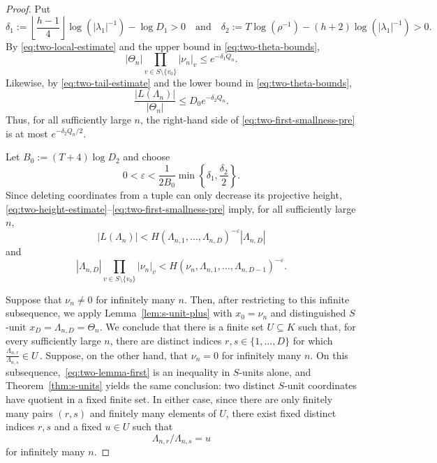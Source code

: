 \documentclass[a4paper,UKenglish,cleveref, autoref, thm-restate]{lipics-v2021}
\begin{document}
\begin{proof}
Put
\[
  \delta_1
  :=
  \left\lfloor \frac{h-1}{4}\right\rfloor \log(|\lambda_1|^{-1})-\log D_1>0
\quad
\text{and}
\quad
  \delta_2
  :=
  T\log(\rho^{-1})
  -(h+2)\log(|\lambda_1|^{-1})>0.
\]
By \eqref{eq:two-local-estimate} and the upper bound in
\eqref{eq:two-theta-bounds},
\begin{equation}\label{eq:two-second-smallness}
  |\Theta_n|
  \prod_{v\in S\setminus\{v_0\}}
  |\nu_n|_v
  \le
  e^{-\delta_1Q_n}.
\end{equation}
Likewise, by \eqref{eq:two-tail-estimate} and the lower bound in
\eqref{eq:two-theta-bounds},
\begin{equation}\label{eq:two-first-smallness-pre}
  \frac{|L(\Lambda_n)|}{|\Theta_n|}
  \le
  D_0e^{-\delta_2Q_n}.
\end{equation}
Thus, for all sufficiently large \(n\), the right-hand side of
\eqref{eq:two-first-smallness-pre} is at most
\(e^{-\delta_2Q_n/2}\).

Let
\(
  B_0:=(T+4)\log D_2
\)
and choose
\[
  0<\varepsilon
  <
  \frac{1}{2B_0}
  \min\left\{\delta_1,\frac{\delta_2}{2}\right\}.
\]
Since deleting coordinates from a tuple can only decrease its projective height,
\eqref{eq:two-height-estimate}--\eqref{eq:two-first-smallness-pre}
imply, for all sufficiently large \(n\),
\begin{equation}\label{eq:two-lemma-first}
  |L(\Lambda_n)|
  <
  H(\Lambda_{n,1},\ldots,\Lambda_{n,D})^{-\varepsilon}
  |\Lambda_{n,D}|
\end{equation}
and
\begin{equation}\label{eq:two-lemma-second}
  |\Lambda_{n,D}|
  \prod_{v\in S\setminus\{v_0\}}
  |\nu_n|_v
  <
  H(\nu_n,\Lambda_{n,1},\ldots,\Lambda_{n,D-1})^{-\varepsilon}.
\end{equation}


Suppose that $\nu_n\neq 0$ for infinitely many $n$.  Then, after restricting to
this infinite subsequence, we apply Lemma~\ref{lem:s-unit-plus} 
with \(x_0=\nu_n\) and distinguished
\(S\)-unit
\(
  x_D=\Lambda_{n,D}=\Theta_n
\).
We conclude that there is a finite set \(U\subseteq K\) such that, for
every sufficiently large \(n\), there are distinct indices
\(r,s\in\{1,\ldots,D\}\) for which
\(
  \frac{\Lambda_{n,r}}{\Lambda_{n,s}}\in U \, .
\)
Suppose, on the other hand, that  $\nu_n=0$ for infinitely many $n$.
On this subsequence,~\eqref{eq:two-lemma-first} is an inequality
in $S$-units alone, and Theorem~\ref{thm:s-units} yields the same
conclusion: two distinct $S$-unit coordinates have quotient in a fixed
finite set.  In either case,
since there are only finitely many pairs \((r,s)\) and finitely many
elements of \(U\), there exist fixed distinct indices \(r,s\) and a
fixed \(u\in U\) such that
\begin{equation}\label{eq:two-fixed-ratio}
  {\Lambda_{n,r}}/{\Lambda_{n,s}}=u
\end{equation}
for infinitely many \(n\).   


\end{proof}
\end{document}
